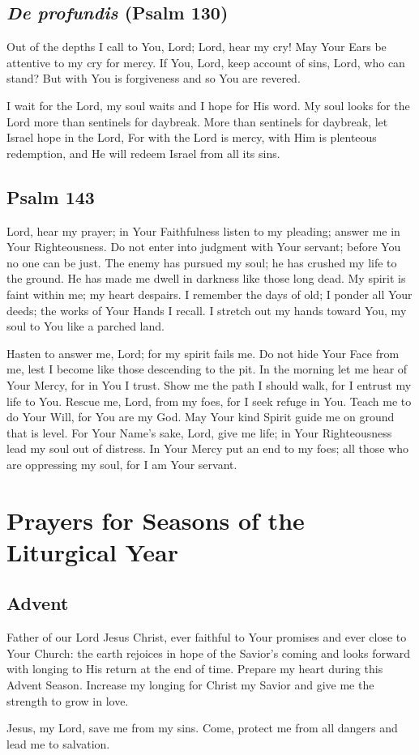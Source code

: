 \documentclass[12pt]{article}
\newcommand{\prayersection}[1]{\section{#1}}
\newcommand{\prayertitle}[1]{\subsection{#1}}
\newcommand{\indulgencedprayertitle}[1]{\prayertitle{#1 \protect\kreuz}}
\newcommand{\emphasis}[1]{\emph{#1}}
\newcommand{\emphasis}[1]{\textsl{#1}}
\newcommand{\foreign}[1]{\emphasis{#1}}
\begin{document}
\indulgencedprayertitle{\foreign{De profundis} (Psalm 130)}
Out of the depths I call to You, Lord;
Lord, hear my cry!
May Your Ears be attentive to my cry for mercy.
If You, Lord, keep account of sins, Lord, who can stand?
But with You is forgiveness and so You are revered.

I wait for the Lord, my soul waits and I hope for His word.
My soul looks for the Lord more than sentinels for daybreak.
More than sentinels for daybreak, let Israel hope in the Lord,
For with the Lord is mercy, with Him is plenteous redemption, and He will redeem Israel from all its sins.

\indulgencedprayertitle{Psalm 143}
Lord, hear my prayer;
in Your Faithfulness listen to my pleading;
answer me in Your Righteousness.
Do not enter into judgment with Your servant;
before You no one can be just.
The enemy has pursued my soul;
he has crushed my life to the ground.
He has made me dwell in darkness like those long dead.
My spirit is faint within me;
my heart despairs.
I remember the days of old;
I ponder all Your deeds;
the works of Your Hands I recall.
I stretch out my hands toward You, my soul to You like a parched land.

Hasten to answer me, Lord;
for my spirit fails me.
Do not hide Your Face from me,
lest I become like those descending to the pit.
In the morning let me hear of Your Mercy, for in You I trust.
Show me the path I should walk, for I entrust my life to You.
Rescue me, Lord, from my foes, for I seek refuge in You.
Teach me to do Your Will, for You are my God.
May Your kind Spirit guide me on ground that is level.
For Your Name's sake, Lord, give me life;
in Your Righteousness lead my soul out of distress.
In Your Mercy put an end to my foes;
all those who are oppressing my soul, for I am Your servant.


\newpage

\prayersection{Prayers for Seasons of the Liturgical Year}
\prayertitle{Advent}
Father of our Lord Jesus Christ, ever faithful to Your promises and ever close to Your Church: the earth rejoices in hope of the Savior's coming and looks forward with longing to His return at the end of time.
Prepare my heart during this Advent Season.
Increase my longing for Christ my Savior and give me the strength to grow in love.

Jesus, my Lord, save me from my sins.
Come, protect me from all dangers and lead me to salvation.
\end{document}
